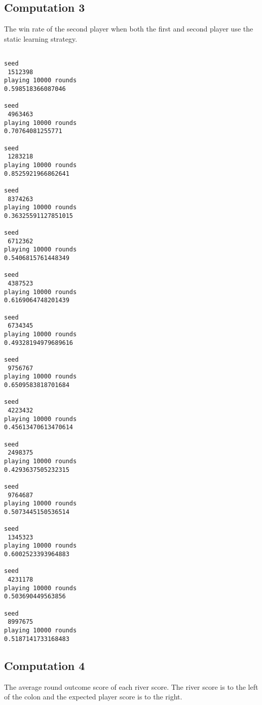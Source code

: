 \documentclass[11pt]{article}
\begin{document}
\subsection{Computation 3}
The win rate of the second player when both the first and second player use the static learning strategy.

\begin{verbatim}

seed
 1512398
playing 10000 rounds
0.598518366087046

seed
 4963463
playing 10000 rounds
0.70764081255771

seed
 1283218
playing 10000 rounds
0.8525921966862641

seed
 8374263
playing 10000 rounds
0.36325591127851015

seed
 6712362
playing 10000 rounds
0.5406815761448349

seed
 4387523
playing 10000 rounds
0.6169064748201439

seed
 6734345
playing 10000 rounds
0.49328194979689616

seed
 9756767
playing 10000 rounds
0.6509583818701684

seed
 4223432
playing 10000 rounds
0.45613470613470614

seed
 2498375
playing 10000 rounds
0.4293637505232315

seed
 9764687
playing 10000 rounds
0.5073445150536514

seed
 1345323
playing 10000 rounds
0.6002523393964883

seed
 4231178
playing 10000 rounds
0.503690449563856

seed
 8997675
playing 10000 rounds
0.5187141733168483

\end{verbatim}

\subsection{Computation 4}
The average round outcome score of each river score. The river score is to the left of the colon and the expected player score is to the right.
\end{document}
